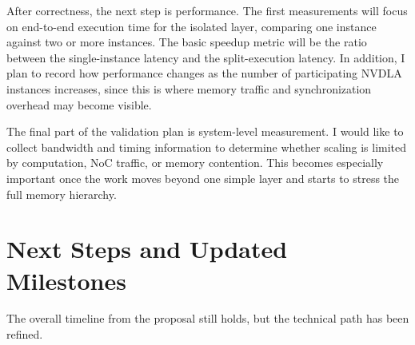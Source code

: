 \documentclass[10pt,sigconf,nonacm]{acmart}
\begin{document}
After correctness, the next step is performance. The first measurements will focus on end-to-end execution time for the isolated layer, comparing one instance against two or more instances. The basic speedup metric will be the ratio between the single-instance latency and the split-execution latency. In addition, I plan to record how performance changes as the number of participating NVDLA instances increases, since this is where memory traffic and synchronization overhead may become visible.

The final part of the validation plan is system-level measurement. I would like to collect bandwidth and timing information to determine whether scaling is limited by computation, NoC traffic, or memory contention. This becomes especially important once the work moves beyond one simple layer and starts to stress the full memory hierarchy.

\section{Next Steps and Updated Milestones}
\label{sec:milestones}
The overall timeline from the proposal still holds, but the technical path has been refined.
\end{document}

